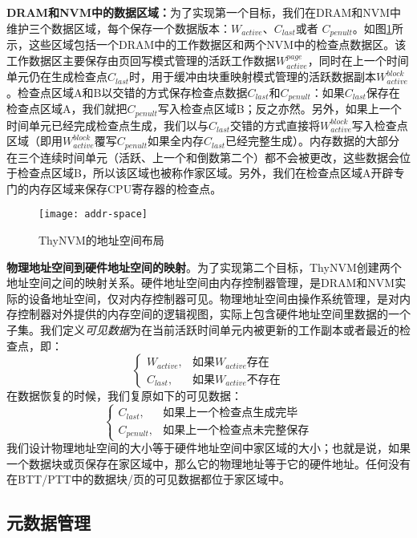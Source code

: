 \textbf{DRAM和NVM中的数据区域：}为了实现第一个目标，我们在DRAM和NVM中维护三个数据区域，每个保存一个数据版本：$W_{active}$、$C_{last}$或者 $C_{penult}$。如图\ref{fig-addr-space}所示，这些区域包括一个DRAM中的工作数据区和两个NVM中的检查点数据区。该工作数据区主要保存由页回写模式管理的活跃工作数据$W^{page}_{active}$，同时在上一个时间单元仍在生成检查点$C_{last}$时，用于缓冲由块重映射模式管理的活跃数据副本$W^{block}_{active}$。检查点区域A和B以交错的方式保存检查点数据$C_{last}$和$C_{penult}$：如果$C_{last}$保存在检查点区域A，我们就把$C_{penult}$写入检查点区域B；反之亦然。另外，如果上一个时间单元已经完成检查点生成，我们以与$C_{last}$交错的方式直接将$W^{block}_{active}$写入检查点区域（即用$W^{block}_{active}$覆写$C_{penult}$如果全内存$C_{last}$已经完整生成）。内存数据的大部分在三个连续时间单元（活跃、上一个和倒数第二个）都不会被更改，这些数据会位于检查点区域B，所以该区域也被称作家区域。另外，我们在检查点区域A开辟专门的内存区域来保存CPU寄存器的检查点。 

\begin{figure}[!h]
\centering
\texttt{[image: addr-space]}
\caption{ThyNVM的地址空间布局}
\label{fig-addr-space}
\end{figure}

\textbf{物理地址空间到硬件地址空间的映射}。为了实现第二个目标，ThyNVM创建两个地址空间之间的映射关系。硬件地址空间由内存控制器管理，是DRAM和NVM实际的设备地址空间，仅对内存控制器可见。物理地址空间由操作系统管理，是对内存控制器对外提供的内存空间的逻辑视图，实际上包含硬件地址空间里数据的一个子集。我们定义\emph{可见数据}为在当前活跃时间单元内被更新的工作副本或者最近的检查点，即： 
\[
\begin{cases}
        W_{active}, & \text{如果}W_{active}\text{存在}\\
        C_{last}, & \text{如果}W_{active}\text{不存在}
\end{cases}
\]
在数据恢复的时候，我们复原如下的可见数据： 
\[
\begin{cases}
        C_{last}, & \text{如果上一个检查点生成完毕}\\
        C_{penult}, & \text{如果上一个检查点未完整保存}
\end{cases}
\]
我们设计物理地址空间的大小等于硬件地址空间中家区域的大小；也就是说，如果一个数据块或页保存在家区域中，那么它的物理地址等于它的硬件地址。任何没有在BTT/PTT中的数据块/页的可见数据都位于家区域中。

\subsection{元数据管理}

